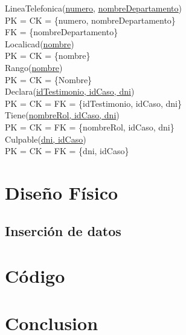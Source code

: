 \documentclass[10pt,a4paper]{article}
\begin{document}
\newline
LineaTelefonica(\underline{numero}, \underline{\underline{nombreDepartamento}})\\ 
	PK = CK = \{numero, nombreDepartamento\}\\ 
	FK = \{nombreDepartamento\}\\
\newline
Localicad(\underline{nombre})\\ 
	PK = CK = \{nombre\}\\ 
\newline
Rango(\underline{nombre})\\ 
	PK = CK = \{Nombre\}\\ 
\newline
Declara(\underline{\underline{idTestimonio, idCaso, dni}})\\ 
	PK = CK = FK = \{idTestimonio, idCaso, dni\}\\
\newline
Tiene(\underline{\underline{nombreRol, idCaso, dni}})\\ 
	PK = CK = FK = \{nombreRol, idCaso, dni\}\\ 
\newline
Culpable(\underline{\underline{dni, idCaso}})\\ 
	PK = CK = FK = \{dni, idCaso\}\\ 

\section{Diseño Físico}

\subsection{Inserción de datos}

\section{Código}

\section{Conclusion}
\end{document}
